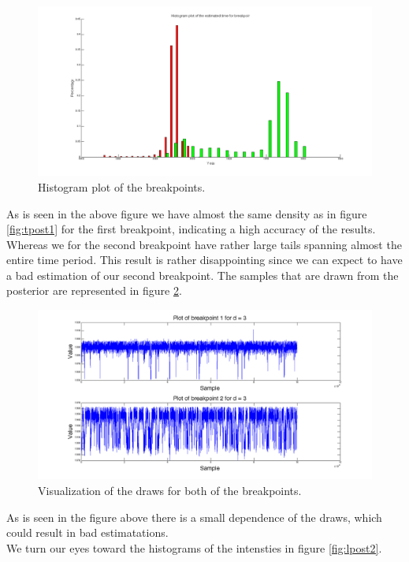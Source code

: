\begin{figure}[H]
\centering
\includegraphics[scale=0.26]{./Figures/tpost2.png}
\caption{Histogram plot of the breakpoints.}
\label{fig:tpost2}
\end{figure}

As is seen in the above figure we have almost the same density as in figure \ref{fig:tpost1} for the first breakpoint, indicating a high accuracy of the results. Whereas we for the second breakpoint have rather large tails spanning almost the entire time period. This result is rather disappointing since we can expect to have a bad estimation of our second breakpoint. The samples that are drawn from the posterior are represented in figure \ref{fig:t2}.

\begin{figure}[H]
\centering
\includegraphics[scale=0.26]{./Figures/t2.png}
\caption{Visualization of the draws for both of the breakpoints.}
\label{fig:t2}
\end{figure}

As is seen in the figure above there is a small dependence of the draws, which could result in bad estimatations. \\
We turn our eyes toward the histograms of the intensties in figure \ref{fig:lpost2}.


